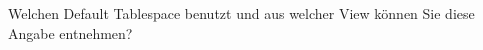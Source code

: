     \item Welchen Default Tablespace benutzt  und aus welcher View können Sie diese Angabe entnehmen?
